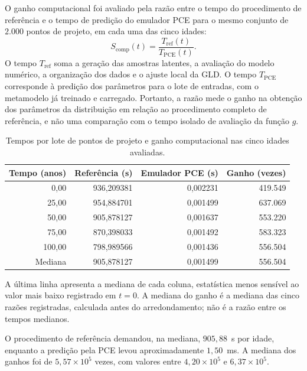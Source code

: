 O ganho computacional foi avaliado pela razão entre o tempo do procedimento de referência e o tempo de predição do emulador PCE para o mesmo conjunto de $2.000$ pontos de projeto, em cada uma das cinco idades:
\begin{equation}
    S_{\mathrm{comp}}(t) = \frac{T_{\mathrm{ref}}(t)}{T_{\mathrm{PCE}}(t)}.
    \label{eq:ex1_speedup}
\end{equation}
O tempo $T_{\mathrm{ref}}$ soma a geração das amostras latentes, a avaliação do modelo numérico, a organização dos dados e o ajuste local da GLD. O tempo $T_{\mathrm{PCE}}$ corresponde à predição dos parâmetros para o lote de entradas, com o metamodelo já treinado e carregado. Portanto, a razão mede o ganho na obtenção dos parâmetros da distribuição em relação ao procedimento completo de referência, e não uma comparação com o tempo isolado de avaliação da função $g$.

\begin{table}[H]
\centering
\caption{Tempos por lote de pontos de projeto e ganho computacional nas cinco idades avaliadas.}
\label{tab:computational_time}
\begin{tabular}{rrrr}
\toprule
Tempo (anos) & Referência (s) & Emulador PCE (s) & Ganho (vezes) \\
\midrule
0,00   & 936,209381 & 0,002231 & 419.549 \\
25,00  & 954,884701 & 0,001499 & 637.069 \\
50,00  & 905,878127 & 0,001637 & 553.220 \\
75,00  & 870,398033 & 0,001492 & 583.323 \\
100,00 & 798,989566 & 0,001436 & 556.504 \\
\midrule
Mediana & 905,878127 & 0,001499 & 556.504 \\
\bottomrule
\end{tabular}
\par\smallskip
\begin{minipage}{0.92\linewidth}
\footnotesize A última linha apresenta a mediana de cada coluna, estatística menos sensível ao valor mais baixo registrado em $t=0$. A mediana do ganho é a mediana das cinco razões registradas, calculada antes do arredondamento; não é a razão entre os tempos medianos.
\end{minipage}
\end{table}

O procedimento de referência demandou, na mediana, $905{,}88$~s por idade, enquanto a predição pela PCE levou aproximadamente $1{,}50$~ms. A mediana dos ganhos foi de $5{,}57\times10^5$ vezes, com valores entre $4{,}20\times10^5$ e $6{,}37\times10^5$.


